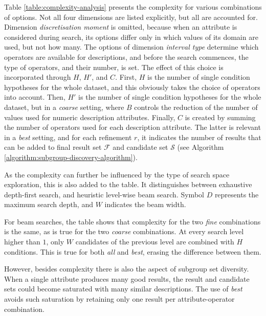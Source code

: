 \documentclass[smallextended]{svjour3}
\newcommand{\hs}{H}
\newcommand{\bw}{W} %
\newcommand{\bb}{C} %
\newcommand{\dm}{D} %
\newcommand{\dimension}{\emph}
\newcommand{\parameter}{\emph}
\newcommand{\fine}{\parameter{fine}}
\newcommand{\coarse}{\parameter{coarse}}
\newcommand{\all}{\parameter{all}}
\newcommand{\best}{\parameter{best}}
\begin{document}
Table \ref{table:complexity-analysis} presents the complexity for various combinations of options.
Not all four dimensions are listed explicitly, but all are accounted for.
Dimension \dimension{discretisation moment} is omitted, because when an attribute is considered during search, its options differ only in which values of its domain are used, but not how many.
The options of dimension \dimension{interval type} determine which operators are available for descriptions, and before the search commences, the type of operators, and their number, is set.
The effect of this choice is incorporated through $\hs{}$, $\hs{}'$, and $\bb{}$.
First, $\hs{}$ is the number of single condition hypotheses for the whole dataset, and this obviously takes the choice of operators into account.
Then, $\hs{}'$ is the number of single condition hypotheses for the whole dataset, but in a \coarse{} setting, where $B$ controls the reduction of the number of values used for numeric description attributes.
Finally, $\bb{}$ is created by summing the number of operators used for each description attribute.
The latter is relevant in a \best{} setting, and for each refinement $r$, it indicates the number of results that can be added to final result set $\mathcal{F}$ and candidate set $\mathcal{S}$ (see Algorithm \ref{algorithm:subgroup-discovery-algorithm}).

As the complexity can further be influenced by the type of search space exploration, this is also added to the table.
It distinguishes between exhaustive depth-first search, and heuristic level-wise beam search.
Symbol $\dm{}$ represents the maximum search depth, and $\bw{}$ indicates the beam width.

For beam searches, the table shows that complexity for the two \fine{} combinations is the same, as is true for the two \coarse{} combinations.
At every search level higher than $1$, only $\bw{}$ candidates of the previous level are combined with $\hs{}$ conditions.
This is true for both \all{} and \best{}, erasing the difference between them.

However, besides complexity there is also the aspect of subgroup set diversity.
When a single attribute produces many good results, the result and candidate sets could become saturated with many similar descriptions.
The use of \best{} avoids such saturation by retaining only one result per attribute-operator combination.
\end{document}
